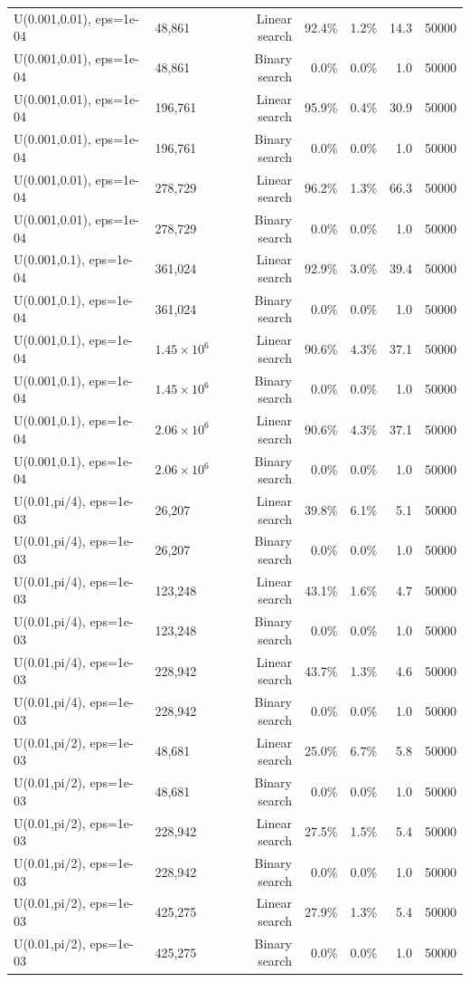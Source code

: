 \begin{tabular}{llrrrrr}
U(0.001,0.01), eps=1e-04 & 48,861 & Linear search & 92.4\% & 1.2\% & 14.3 & 50000 \\
U(0.001,0.01), eps=1e-04 & 48,861 & Binary search & 0.0\% & 0.0\% & 1.0 & 50000 \\
U(0.001,0.01), eps=1e-04 & 196,761 & Linear search & 95.9\% & 0.4\% & 30.9 & 50000 \\
U(0.001,0.01), eps=1e-04 & 196,761 & Binary search & 0.0\% & 0.0\% & 1.0 & 50000 \\
U(0.001,0.01), eps=1e-04 & 278,729 & Linear search & 96.2\% & 1.3\% & 66.3 & 50000 \\
U(0.001,0.01), eps=1e-04 & 278,729 & Binary search & 0.0\% & 0.0\% & 1.0 & 50000 \\
U(0.001,0.1), eps=1e-04 & 361,024 & Linear search & 92.9\% & 3.0\% & 39.4 & 50000 \\
U(0.001,0.1), eps=1e-04 & 361,024 & Binary search & 0.0\% & 0.0\% & 1.0 & 50000 \\
U(0.001,0.1), eps=1e-04 & $1.45\times 10^{6}$ & Linear search & 90.6\% & 4.3\% & 37.1 & 50000 \\
U(0.001,0.1), eps=1e-04 & $1.45\times 10^{6}$ & Binary search & 0.0\% & 0.0\% & 1.0 & 50000 \\
U(0.001,0.1), eps=1e-04 & $2.06\times 10^{6}$ & Linear search & 90.6\% & 4.3\% & 37.1 & 50000 \\
U(0.001,0.1), eps=1e-04 & $2.06\times 10^{6}$ & Binary search & 0.0\% & 0.0\% & 1.0 & 50000 \\
U(0.01,pi/4), eps=1e-03 & 26,207 & Linear search & 39.8\% & 6.1\% & 5.1 & 50000 \\
U(0.01,pi/4), eps=1e-03 & 26,207 & Binary search & 0.0\% & 0.0\% & 1.0 & 50000 \\
U(0.01,pi/4), eps=1e-03 & 123,248 & Linear search & 43.1\% & 1.6\% & 4.7 & 50000 \\
U(0.01,pi/4), eps=1e-03 & 123,248 & Binary search & 0.0\% & 0.0\% & 1.0 & 50000 \\
U(0.01,pi/4), eps=1e-03 & 228,942 & Linear search & 43.7\% & 1.3\% & 4.6 & 50000 \\
U(0.01,pi/4), eps=1e-03 & 228,942 & Binary search & 0.0\% & 0.0\% & 1.0 & 50000 \\
U(0.01,pi/2), eps=1e-03 & 48,681 & Linear search & 25.0\% & 6.7\% & 5.8 & 50000 \\
U(0.01,pi/2), eps=1e-03 & 48,681 & Binary search & 0.0\% & 0.0\% & 1.0 & 50000 \\
U(0.01,pi/2), eps=1e-03 & 228,942 & Linear search & 27.5\% & 1.5\% & 5.4 & 50000 \\
U(0.01,pi/2), eps=1e-03 & 228,942 & Binary search & 0.0\% & 0.0\% & 1.0 & 50000 \\
U(0.01,pi/2), eps=1e-03 & 425,275 & Linear search & 27.9\% & 1.3\% & 5.4 & 50000 \\
U(0.01,pi/2), eps=1e-03 & 425,275 & Binary search & 0.0\% & 0.0\% & 1.0 & 50000 \\
\bottomrule
\end{tabular}
